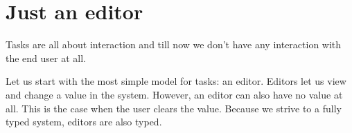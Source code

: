 \section{Just an editor}

Tasks are all about interaction and till now we don't have any interaction with the end user at all.

Let us start with the most simple model for tasks: an editor.
Editors let us view and change a value in the system.
However, an editor can also have no value at all.
This is the case when the user clears the value.
Because we strive to a fully typed system, editors are also typed.

